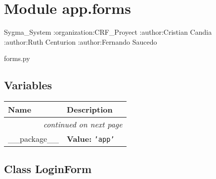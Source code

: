 %
%
%


\section{Module app.forms}

    \label{app:forms}
Sygma\_System :organization:CRF\_Proyect :author:Cristian Candia 
:author:Ruth Centurion :author:Fernando Saucedo

forms.py



  \subsection{Variables}

    \vspace{-1cm}
\hspace{\varindent}\begin{longtable}{|p{\varnamewidth}|p{\vardescrwidth}|l}
\cline{1-2}
\cline{1-2} \centering \textbf{Name} & \centering \textbf{Description}& \\
\cline{1-2}
\endhead\cline{1-2}\multicolumn{3}{r}{\small\textit{continued on next page}}\\\endfoot\cline{1-2}
\endlastfoot\raggedright \_\-\_\-p\-a\-c\-k\-a\-g\-e\-\_\-\_\- & \raggedright \textbf{Value:} 
{\tt \texttt{'}\texttt{app}\texttt{'}}&\\
\cline{1-2}
\end{longtable}



\subsection{Class LoginForm}

